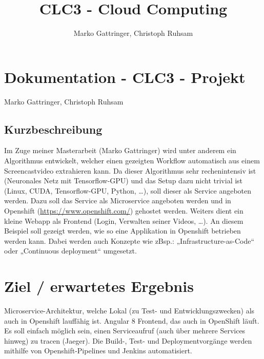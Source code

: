 \documentclass[11pt, a4paper, twoside]{article}   	%
\title{CLC3 - Cloud Computing}
\author{Marko Gattringer, Christoph Ruhsam}
\begin{document}
\setlength{\headheight}{15mm}

\section{Dokumentation - CLC3 - Projekt}
Marko Gattringer, Christoph Ruhsam

\subsection{Kurzbeschreibung}
Im Zuge meiner Masterarbeit (Marko Gattringer) wird unter anderem ein Algorithmus entwickelt, welcher einen gezeigten Workflow automatisch aus einem Screencastvideo extrahieren kann. Da dieser Algorithmus sehr rechenintensiv ist (Neuronales Netz mit Tensorflow-GPU) und das Setup dazu nicht trivial ist (Linux, CUDA, Tensorflow-GPU, Python, …), soll dieser als Service angeboten werden. Dazu soll das Service als Microservice angeboten werden und in Openshift (\href{https://www.openshift.com/}{https://www.openshift.com/}) gehostet werden. Weiters dient ein kleine Webapp als Frontend (Login, Verwalten seiner Videos, …). An diesem Beispiel soll gezeigt werden, wie so eine Applikation in Openshift betrieben werden kann. Dabei werden auch Konzepte wie zBsp.: „Infrastructure-as-Code“ oder „Continuous deployment“ umgesetzt.

\section{Ziel / erwartetes Ergebnis}
Microservice-Architektur, welche Lokal (zu Test- und Entwicklungszwecken) als auch in Openshift lauffähig ist.
Angular 8 Frontend, das auch in OpenShift läuft.
Es soll einfach möglich sein, einen Serviceaufruf (auch über mehrere Services hinweg) zu tracen (Jaeger).
Die Build-, Test- und Deploymentvorgänge werden mithilfe von Openshift-Pipelines und Jenkins automatisiert.
\end{document}
